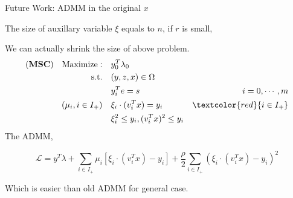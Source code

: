 \documentclass[aspectratio=1610, 10pt]{beamer}
\newcommand{\model}[1]{(\textbf{#1})}
\newcommand{\red}[1]{\textcolor{red}{#1}}
\begin{document}
\begin{frame}[allowframebreaks]{Future Work: ADMM in the original \(x\)}
  \framebreak

  The size of auxillary variable \(\xi\) equals to \(n\), if \(r\) is small,

  We can actually shrink the size of above problem.
  \begin{align}
    \model{MSC} \quad \mathrm{Maximize: }\quad & y_0 ^T\lambda_0                                       \\
    \mathrm{s.t.} \quad                        & (y,z,x) \in \Omega                                    \\
                                               & y_i^Te = s                           & i=0, \cdots, m \\
    ( \mu_i, i\in I_+ )    \quad               & \xi_i \cdot (v_i^Tx) = y_i           & \red{i\in I_+} \\
                                               & \xi_i^2 \le y_i,  (v_i^Tx)^2 \le y_i
  \end{align}
  The ADMM,

  \begin{equation}
    \mathcal L = y^T\lambda + \sum_{i \in I_+} \mu_i \left [\xi_i \cdot(v_i^Tx) - y_i\right] + \frac{\rho}{2}\sum_{i \in I_+} (\xi_i \cdot (v_i^Tx) - y_i)^2
  \end{equation}

  Which is easier than old ADMM for general case.

\end{frame}





\end{document}
